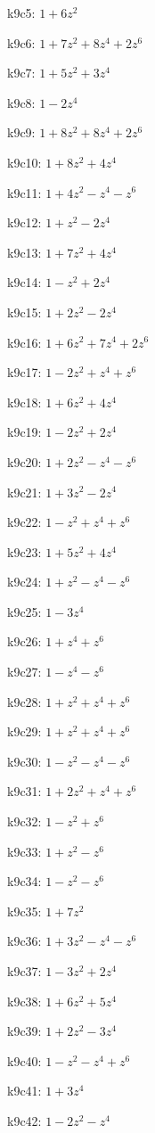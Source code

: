 k9c5: $ 1+6z^{2} $ 

k9c6: $ 1+7z^{2}+8z^{4}+2z^{6} $ 

k9c7: $ 1+5z^{2}+3z^{4} $ 

k9c8: $ 1-2z^{4} $ 

k9c9: $ 1+8z^{2}+8z^{4}+2z^{6} $ 

k9c10: $ 1+8z^{2}+4z^{4} $ 

k9c11: $ 1+4z^{2}-z^{4}-z^{6} $ 

k9c12: $ 1+z^{2}-2z^{4} $ 

k9c13: $ 1+7z^{2}+4z^{4} $ 

k9c14: $ 1-z^{2}+2z^{4} $ 

k9c15: $ 1+2z^{2}-2z^{4} $ 

k9c16: $ 1+6z^{2}+7z^{4}+2z^{6} $ 

k9c17: $ 1-2z^{2}+z^{4}+z^{6} $ 

k9c18: $ 1+6z^{2}+4z^{4} $ 

k9c19: $ 1-2z^{2}+2z^{4} $ 

k9c20: $ 1+2z^{2}-z^{4}-z^{6} $ 

k9c21: $ 1+3z^{2}-2z^{4} $ 

k9c22: $ 1-z^{2}+z^{4}+z^{6} $ 

k9c23: $ 1+5z^{2}+4z^{4} $ 

k9c24: $ 1+z^{2}-z^{4}-z^{6} $ 

k9c25: $ 1-3z^{4} $ 

k9c26: $ 1+z^{4}+z^{6} $ 

k9c27: $ 1-z^{4}-z^{6} $ 

k9c28: $ 1+z^{2}+z^{4}+z^{6} $ 

k9c29: $ 1+z^{2}+z^{4}+z^{6} $ 

k9c30: $ 1-z^{2}-z^{4}-z^{6} $ 

k9c31: $ 1+2z^{2}+z^{4}+z^{6} $ 

k9c32: $ 1-z^{2}+z^{6} $ 

k9c33: $ 1+z^{2}-z^{6} $ 

k9c34: $ 1-z^{2}-z^{6} $ 

k9c35: $ 1+7z^{2} $ 

k9c36: $ 1+3z^{2}-z^{4}-z^{6} $ 

k9c37: $ 1-3z^{2}+2z^{4} $ 

k9c38: $ 1+6z^{2}+5z^{4} $ 

k9c39: $ 1+2z^{2}-3z^{4} $ 

k9c40: $ 1-z^{2}-z^{4}+z^{6} $ 

k9c41: $ 1+3z^{4} $ 

k9c42: $ 1-2z^{2}-z^{4} $ 

